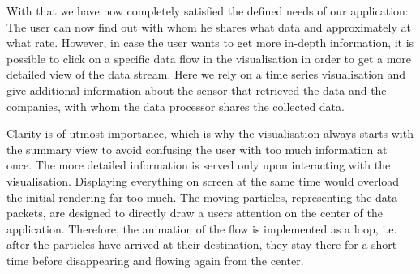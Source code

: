 \documentclass[../paper.tex]{subfiles}
\begin{document}
  With that we have now completely satisfied the defined needs of our application:
  The user can now find out with whom he shares what data and approximately at what
  rate. However, in case the user wants to get more in-depth information, it is
  possible to click on a specific data flow in the visualisation in order
  to get a more detailed view of the data stream. Here we rely on a time series
  visualisation and give additional information about the sensor that retrieved
  the data and the companies, with whom the data processor shares the collected data.

  Clarity is of utmost importance, which is why the visualisation always starts
  with the summary view to avoid confusing the user with too much information
  at once. The more detailed information is served only upon interacting with
  the visualisation. Displaying everything on screen at the same time would
  overload the initial rendering far too much. The moving particles, representing the
  data packets, are designed to directly draw a users attention on the center of the
  application. Therefore, the animation of the flow is implemented as a loop, i.e.
  after the particles have arrived at their destination, they stay there for a short
  time before disappearing and flowing again from the center.
\end{document}
